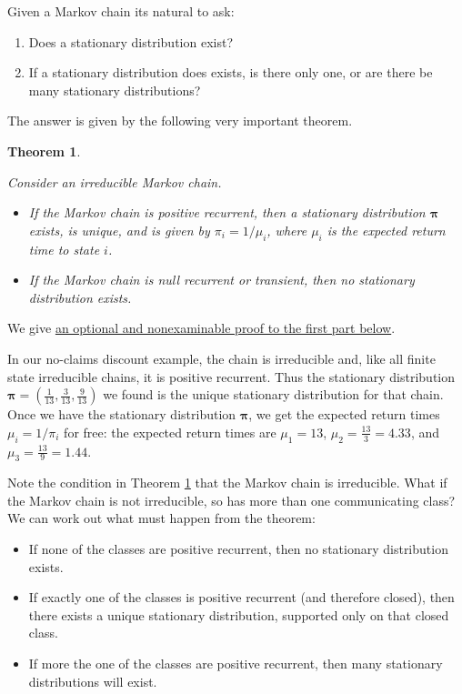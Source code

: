 \documentclass[
  a4paper,
]{article}
\providecommand{\tightlist}{%
  \setlength{\itemsep}{0pt}\setlength{\parskip}{0pt}}
\newtheorem{theorem}{Theorem}[section]
\theoremstyle{definition}
\theoremstyle{definition}
\theoremstyle{definition}
\theoremstyle{remark}
\begin{document}
Given a Markov chain its natural to ask:

\begin{enumerate}
\def\labelenumi{\arabic{enumi}.}
\tightlist
\item
  Does a stationary distribution exist?
\item
  If a stationary distribution does exists, is there only one, or are there be many stationary distributions?
\end{enumerate}

The answer is given by the following very important theorem.

\begin{theorem}
\protect\hypertarget{thm:statex}{}\label{thm:statex}

Consider an irreducible Markov chain.

\begin{itemize}
\tightlist
\item
  If the Markov chain is positive recurrent, then a stationary distribution \(\boldsymbol \pi\) exists, is unique, and is given by \(\pi_i = 1/\mu_{i}\), where \(\mu_{i}\) is the expected return time to state \(i\).
\item
  If the Markov chain is null recurrent or transient, then no stationary distribution exists.
\end{itemize}

\end{theorem}

We give \protect\hyperlink{stat-proof}{an optional and nonexaminable proof to the first part below}.

In our no-claims discount example, the chain is irreducible and, like all finite state irreducible chains, it is positive recurrent. Thus the stationary distribution \(\boldsymbol\pi = (\tfrac{1}{13}, \tfrac{3}{13}, \tfrac{9}{13})\) we found is the unique stationary distribution for that chain.
Once we have the stationary distribution \(\boldsymbol\pi\), we get the expected return times \(\mu_i = 1/\pi_i\) for free: the expected return times are \(\mu_1 = 13\), \(\mu_2 = \frac{13}{3} = 4.33\), and \(\mu_3 = \frac{13}{9} = 1.44\).

Note the condition in Theorem \ref{thm:statex} that the Markov chain is irreducible. What if the Markov chain is not irreducible, so has more than one communicating class? We can work out what must happen from the theorem:

\begin{itemize}
\tightlist
\item
  If none of the classes are positive recurrent, then no stationary distribution exists.
\item
  If exactly one of the classes is positive recurrent (and therefore closed), then there exists a unique stationary distribution, supported only on that closed class.
\item
  If more the one of the classes are positive recurrent, then many stationary distributions will exist.
\end{itemize}
\end{document}
